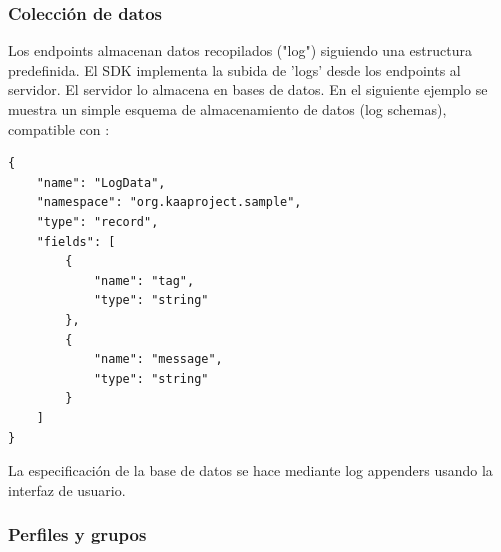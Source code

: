 \documentclass[12pt, twoside]{book}
\newcommand{\MYhref}[3][blue]{\href{#2}{\color{#1}{#3}}}
\begin{document}
\subsubsection*{Colección de datos}
Los endpoints almacenan datos recopilados ("log") siguiendo una estructura predefinida. El SDK implementa la subida de 'logs' desde los endpoints al servidor. El servidor lo almacena en bases de datos. En el siguiente ejemplo se muestra un simple esquema de almacenamiento de datos (log schemas), compatible con \MYhref{http://avro.apache.org/docs/current/spec.html}{Avro Schema}:
\begin{lstlisting}
{
    "name": "LogData",
    "namespace": "org.kaaproject.sample",
    "type": "record",
    "fields": [
    	{
            "name": "tag",
            "type": "string"
        },
        {
            "name": "message",
            "type": "string"
        }
    ]
}
\end{lstlisting}
La especificación de la base de datos se hace mediante log appenders usando la interfaz de usuario. 
\subsubsection*{Perfiles y grupos}\label{sec:grouping}
\end{document}
